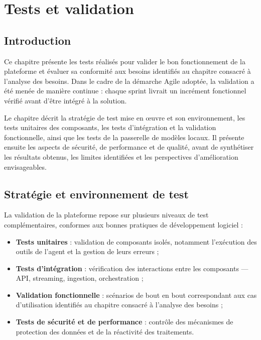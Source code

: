 \chapter{Tests et validation}

\section{Introduction}

Ce chapitre présente les tests réalisés pour valider le bon fonctionnement de la plateforme et évaluer sa conformité aux besoins identifiés au chapitre consacré à l'analyse des besoins. Dans le cadre de la démarche Agile adoptée, la validation a été menée de manière continue : chaque sprint livrait un incrément fonctionnel vérifié avant d'être intégré à la solution.

Le chapitre décrit la stratégie de test mise en œuvre et son environnement, les tests unitaires des composants, les tests d'intégration et la validation fonctionnelle, ainsi que les tests de la passerelle de modèles locaux. Il présente ensuite les aspects de sécurité, de performance et de qualité, avant de synthétiser les résultats obtenus, les limites identifiées et les perspectives d'amélioration envisageables.

\section{Stratégie et environnement de test}

La validation de la plateforme repose sur plusieurs niveaux de test complémentaires, conformes aux bonnes pratiques de développement logiciel :

\begin{itemize}
  \item \textbf{Tests unitaires} : validation de composants isolés, notamment l'exécution des outils de l'agent et la gestion de leurs erreurs ;
  \item \textbf{Tests d'intégration} : vérification des interactions entre les composants — API, streaming, ingestion, orchestration ;
  \item \textbf{Validation fonctionnelle} : scénarios de bout en bout correspondant aux cas d'utilisation identifiés au chapitre consacré à l'analyse des besoins ;
  \item \textbf{Tests de sécurité et de performance} : contrôle des mécanismes de protection des données et de la réactivité des traitements.
\end{itemize}

